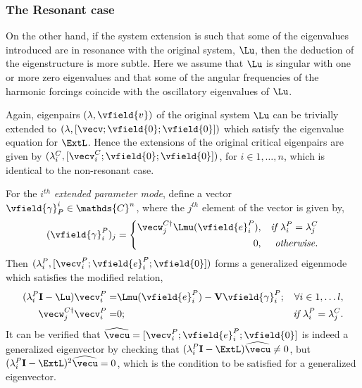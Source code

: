 \subsubsection{The Resonant case}

On the other hand, if the system extension is such that some of the eigenvalues introduced are in resonance with the original system, $\Lu$, then the deduction of the eigenstructure is more subtle. Here we assume that $\Lu$ is singular with one or more zero eigenvalues and that some of the angular frequencies of the harmonic forcings coincide with the oscillatory eigenvalues of $\Lu$. 

Again, eigenpairs $(\lambda, \vfield{v})$ of the original system $\Lu$ can be trivially extended to $(\lambda, [\vecv; \vfield{0}; \vfield{0}])$ which satisfy the eigenvalue equation for $\ExtL$. Hence the extensions of the original critical eigenpairs are given by $(\lambda^{C}_{i}, [\vecv^{C}_{i}; \vfield{0}; \vfield{0}])$, for $i \in 1,\ldots,n$, which is identical to the non-resonant case.

For the $i^{th}$ \emph{extended parameter mode}, define a vector $\vfield{\gamma}^{i}_{P} \in \mathds{C}^{n}$, where the $j^{th}$ element of the vector is given by,
\begin{equation}
	(\vfield{\gamma}^{P}_{i})_{j} =
	\left\lbrace
	\begin{split}
		\vecw^{C\dagger}_{j}\Lmu(\vfield{e}^{P}_{i}),  && \textit{if } \lambda^{P}_{i} = \lambda^{C}_{j} \\
		0,						 && \textit{otherwise.}	
	\end{split}\right.
\end{equation}
Then $(\lambda^{P}_{i}, [\vecv^{P}_{i};\vfield{e}^{P}_{i}; \vfield{0}])$ forms a generalized eigenmode which satisfies the modified relation,
\begin{subequations}
	\label{eqn:singular_pmode}
	\begin{align}
		(\lambda^{P}_{i}\mathbf{I} - \Lu)\vecv^{P}_{i} =& \Lmu(\vfield{e}^{P}_{i}) - \mathbf{V}\vfield{\gamma}^{P}_{i};&  \forall i\in 1,\ldots l, \\
		\vecw^{C\dagger}_{j}\vecv^{P}_{i} =& 0; & \textit{if } \lambda^{P}_{i} = \lambda^{C}_{j}. 
	\end{align}
\end{subequations}
It can be verified that $\widehat{\vecu} = [\vecv^{P}_{i};\vfield{e}^{P}_{i}; \vfield{0}]$ is indeed a generalized eigenvector by checking that $(\lambda^{P}_{i}\mathbf{I} - \ExtL )\widehat{\vecu} \ne 0$, but $(\lambda^{P}_{i}\mathbf{I} - \ExtL )^{2}\widehat{\vecu} = 0$, which is the condition to be satisfied for a generalized eigenvector.


